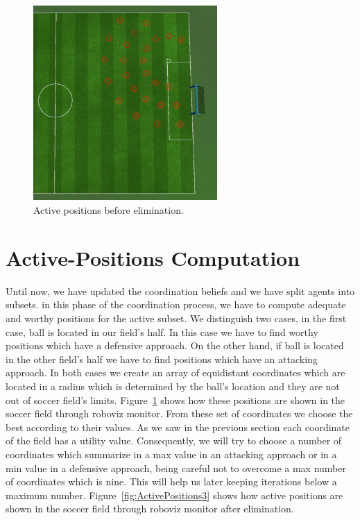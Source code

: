 \begin{figure}[t!]
\centering
  \includegraphics[width=7cm]{Chapter4/figures/ActivePositions2.png}
  \caption{Active positions before elimination.} 
  \label{fig:ActivePositions2}
\end{figure}

\section{Active-Positions Computation}
Until now, we have updated the coordination beliefs and we have split agents into subsets. in this phase of the coordination process, we have to compute adequate and worthy positions for the active subset. We distinguish two cases, in the first case, ball is located in our field's half. In this case we have to find worthy positions which have a defensive approach. On the other hand, if ball is located in the other field's half we have to find positions which have an attacking approach. In both cases we create an array of equidistant coordinates which are located in a radius which is determined by the ball's location and they are not out of soccer field's limits. Figure~\ref{fig:ActivePositions2} shows how these positions are shown in the soccer field through roboviz monitor. 
From these set of coordinates we choose the best according to their values. As we saw in the previous section each coordinate of the field has a utility value. Consequently, we will try to choose a number of coordinates which summarize in a max value in an attacking approach or in a min value in a defensive approach, being careful not to overcome a max number of coordinates which is nine. This will help us later keeping iterations below a maximum number. Figure~\ref{fig:ActivePositions3} shows how active positions are shown in the soccer field through roboviz monitor after elimination. 



